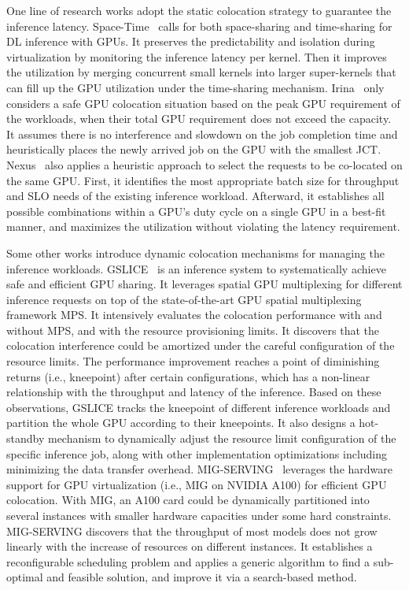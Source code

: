 One line of research works adopt the static colocation strategy to guarantee the inference latency. Space-Time~\cite{jain2018dynamic} calls for both space-sharing and time-sharing
for DL inference with GPUs. It preserves the predictability and isolation during virtualization by monitoring the inference latency per kernel. Then it improves the utilization by merging concurrent small kernels into larger super-kernels that can fill up the GPU utilization under the time-sharing mechanism. Irina~\cite{wu2020irina} only considers a safe GPU colocation situation based on the peak GPU requirement of the workloads, when their total GPU requirement does not exceed the capacity. It assumes there is no interference and slowdown on the job completion time and heuristically places the newly arrived job on the GPU with the smallest JCT. Nexus~\cite{shen2019nexus} also applies a heuristic approach to select the requests to be co-located on the same GPU. First, it identifies the most appropriate batch size for throughput and SLO needs of the existing inference workload. Afterward, it establishes all possible combinations within a GPU’s duty cycle on a single GPU in a best-fit manner, and maximizes the utilization without violating the latency requirement.



Some other works introduce dynamic colocation mechanisms for managing the inference workloads.
GSLICE~\cite{dhakal2020GSLICE} is an inference system to systematically achieve safe and efficient GPU sharing. It leverages spatial GPU multiplexing for different inference requests on top of the state-of-the-art GPU spatial multiplexing framework MPS. It intensively evaluates the colocation performance with and without MPS, and with the resource provisioning limits. It discovers that the colocation interference could be amortized under the careful configuration of the resource limits. The performance improvement reaches a point of diminishing returns (i.e., kneepoint) after certain configurations, which has a non-linear relationship with the throughput and latency of the inference. Based on these observations, GSLICE tracks the kneepoint of different inference workloads and partition the whole GPU according to their kneepoints. It also designs a hot-standby mechanism to dynamically adjust the resource limit configuration of the specific inference job, along with other implementation optimizations including minimizing the data transfer overhead. MIG-SERVING~\cite{tan2021MIG-SERVING} leverages the hardware support for GPU virtualization (i.e., MIG \cite{mig} on NVIDIA A100\cite{nvidia2020a100whitepaper}) for efficient GPU colocation.
With MIG, an A100 card could be dynamically partitioned into several instances with smaller hardware capacities under some hard constraints. MIG-SERVING discovers that the throughput of most models does not grow linearly with the increase of resources on different instances.
It establishes a reconfigurable scheduling problem and applies a generic algorithm to find a sub-optimal and feasible solution, and improve it via a search-based method.


